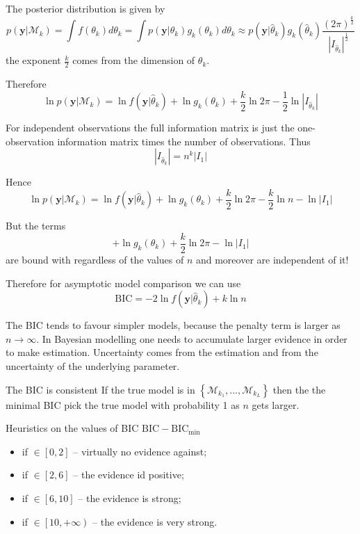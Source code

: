\documentclass[a4paper]{article}
\newcommand{\obj}[1]{{\left\{ #1 \right \}}}
\newcommand{\clo}[1]{{\left [ #1 \right ]}}
\newcommand{\clop}[1]{{\left [ #1 \right )}}
\newcommand{\brac}[1]{{\left ( #1 \right )}}
\newcommand{\induc}[1]{{\left . #1 \right \vert}}
\newcommand{\abs}[1]{{\left | #1 \right |}}
\newcommand{\Mcal}{\mathcal{M}}
\begin{document}
The posterior distribution is given by 
\[p\brac{\induc{\mathbf{y}}\Mcal_k} = \int f(\theta_k) d \theta_k = \int p\brac{\induc{\mathbf{y}}\theta_k} g_k(\theta_k) d \theta_k \approx p\brac{\induc{\mathbf{y}}\hat{\theta}_k} g_k(\hat{\theta}_k) \frac{\brac{2\pi}^\frac{k}{2}}{\abs{I_{\hat{\theta}_k}}^\frac{1}{2}}\]
the exponent $\frac{k}{2}$ comes from the dimension of $\theta_k$.

Therefore
\[\ln p\brac{\induc{\mathbf{y}}\Mcal_k} = \ln f\brac{\induc{\mathbf{y}}\hat{\theta}_k} + \ln g_k(\theta_k) + \frac{k}{2} \ln 2 \pi - \frac{1}{2}\ln \abs{I_{\hat{\theta}_k}} \]

For independent observations the full information matrix is just the one-observation information matrix times the number of observations.
Thus 
\[\abs{I_{\hat{\theta}_k}} = n^k \abs{I_1}\]

Hence 
\[\ln p\brac{\induc{\mathbf{y}}\Mcal_k} = \ln f\brac{\induc{\mathbf{y}}\hat{\theta}_k} + \ln g_k(\theta_k) + \frac{k}{2} \ln 2 \pi - \frac{k}{2}\ln n - \ln \abs{I_1} \]

But the terms 
\[ + \ln g_k(\theta_k) + \frac{k}{2} \ln 2 \pi - \ln \abs{I_1}\]
are bound with regardless of the values of $n$ and moreover are independent of it!

Therefore for asymptotic model comparison we can use
\[\text{BIC} = -2\ln f\brac{\induc{\mathbf{y}}\hat{\theta}_k} + k\ln n \]

The BIC tends to favour simpler models, because the penalty term is larger as $n\to \infty$.
In Bayesian modelling one needs to accumulate larger evidence in order to make estimation.
Uncertainty comes from the estimation and from the uncertainty of the underlying parameter.


The BIC is consistent
If the true model is in $\obj{\Mcal_{k_1},\ldots,\Mcal_{k_L}}$ then the the minimal BIC pick the true model with probability 1 as $n$ gets larger.

Heuristics on the values of BIC $\text{BIC}-\text{BIC}_{\min}$
\begin{itemize}
	\item if $\in\clo{0,2}$ -- virtually no evidence against;
	\item if $\in\clo{2,6}$ -- the evidence id positive;
	\item if $\in\clo{6,10}$ -- the evidence is strong;
	\item if $\in\clop{10, +\infty}$ -- the evidence is very strong.
\end{itemize}
\end{document}
